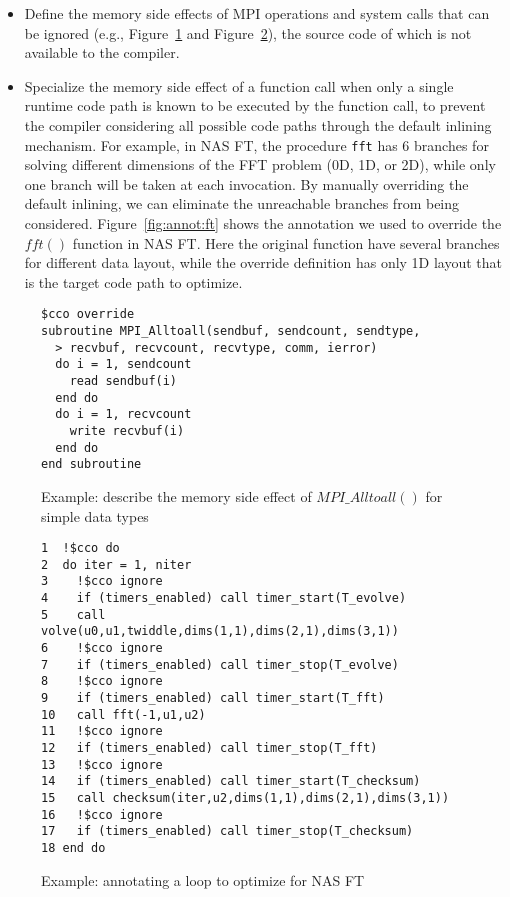 \begin{itemize}
\item Define the memory side effects of MPI operations and system calls that can be ignored (e.g., Figure~\ref{fig:annot:a2a} and Figure~\ref{fig:code:ft}), the source code of which is not available to the compiler.

\item Specialize the memory side effect of a function call when only a single runtime code path is known to be executed by the function call,  to prevent the compiler considering all possible code paths through the default inlining mechanism.  For
  example, in NAS FT, the procedure \texttt{fft} has 6 branches for
  solving different dimensions of the FFT problem (0D, 1D, or 2D),
  while only one branch will be taken at each invocation.  By manually
  overriding the default inlining, we can eliminate the unreachable
  branches from being considered.
  Figure~\ref{fig:annot:ft} shows the annotation we used to override the $fft()$
function in NAS FT.  Here the original function have several branches for
different data layout, while the override definition has only 1D
layout that is the target code path to optimize.



\end{itemize}


\begin{figure}[h]
{\scriptsize
\begin{verbatim}
$cco override
subroutine MPI_Alltoall(sendbuf, sendcount, sendtype,
  > recvbuf, recvcount, recvtype, comm, ierror)
  do i = 1, sendcount
    read sendbuf(i)
  end do
  do i = 1, recvcount
    write recvbuf(i)
  end do
end subroutine
\end{verbatim}
}
\caption{Example: describe the memory side effect of $MPI\_Alltoall()$ for simple data types}
\label{fig:annot:a2a}
\end{figure}

\begin{figure}[h]
{\scriptsize
\begin{verbatim}
1  !$cco do
2  do iter = 1, niter
3    !$cco ignore
4    if (timers_enabled) call timer_start(T_evolve)
5    call volve(u0,u1,twiddle,dims(1,1),dims(2,1),dims(3,1))
6    !$cco ignore
7    if (timers_enabled) call timer_stop(T_evolve)
8    !$cco ignore
9    if (timers_enabled) call timer_start(T_fft)
10   call fft(-1,u1,u2)
11   !$cco ignore
12   if (timers_enabled) call timer_stop(T_fft)
13   !$cco ignore
14   if (timers_enabled) call timer_start(T_checksum)
15   call checksum(iter,u2,dims(1,1),dims(2,1),dims(3,1))
16   !$cco ignore
17   if (timers_enabled) call timer_stop(T_checksum)
18 end do
\end{verbatim}
}
\caption{Example: annotating a loop to optimize for NAS FT}
\label{fig:code:ft}
\end{figure}


